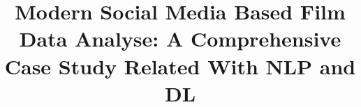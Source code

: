 \documentclass[sigconf]{acmart}
\begin{document}
\title{Modern Social Media Based Film Data Analyse: A Comprehensive Case Study Related With NLP and DL}

\maketitle












%
%
\end{document}
